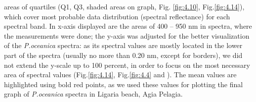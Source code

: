 \documentclass[10pt, a4paper]{article}
\begin{document}
areas of quartiles (Q1, Q3, shaded areas on graph, Fig. \ref{fig:4.10}, Fig.\ref{fig:4.14}), which cover most probable data distribution
(spectral reflectance) for each spectral band. In x-axis displayed are the areas of 400 – 950 nm in
spectra, where the measurements were done; the y-axis was adjusted for the better visualization of the
\textit{P.oceanica} spectra: as its spectral values are mostly located in the lower part of the spectra (usually no
more than 0.20 nm, except for borders), we did not extend the y-scale up to 100 percent, in order to
focus on the most necessary area of spectral values (Fig.\ref{fig:4.14}, Fig.\ref{fig:4.4} and ). The mean values are
highlighted using bold red points, as we used these values for plotting the final graph of \textit{P.oceanica} spectra in
Ligaria beach, Agia Pelagia.
\end{document}
